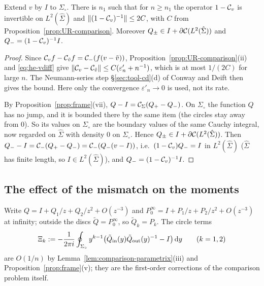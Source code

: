 \begin{proposition}\label{prop:UR-true}
Extend $v$ by $I$ to $\Sigma_{\circ}$. There is $n_1$ such that for $n\ge n_1$ the operator $1-\mathcal{C}_v$ is invertible on
$L^2(\hat\Sigma)$ and $\|(1-\mathcal{C}_v)^{-1}\|\le2C$, with $C$ from Proposition~\ref{prop:UR-comparison}. Moreover
$Q_\pm\in I+\partial\mathcal{C}(L^2(\hat\Sigma))$ and $Q_-=(1-\mathcal{C}_v)^{-1}I$.
\end{proposition}

\begin{proof}
Since $\mathcal{C}_vf-\mathcal{C}_{\tilde v}f=\mathcal{C}_-(f(v-\tilde v))$, Proposition~\ref{prop:UR-comparison}(ii) and
\eqref{eq:he-vdiff} give $\|\mathcal{C}_v-\mathcal{C}_{\tilde v}\|\le C(\varepsilon'_n+n^{-1})$, which is at most $1/(2C)$ for
large $n$. The Neumann-series step \S\ref{sec:tool-cd}(d) of Conway and Deift then gives the bound. Here only the convergence
$\varepsilon'_n\to0$ is used, not its rate.

By Proposition~\ref{prop:frame}(vii), $Q-I=\mathcal{C}_\Sigma(Q_+-Q_-)$. On $\Sigma_{\circ}$ the function $Q$ has no jump, and it is bounded there by the same item
(the circles stay away from $0$). So its values on $\Sigma_{\circ}$ are the boundary values of the same Cauchy integral,
now regarded on $\hat\Sigma$ with density $0$ on $\Sigma_{\circ}$. Hence $Q_\pm\in I+\partial\mathcal{C}(L^2(\hat\Sigma))$. Then
$Q_--I=\mathcal{C}_-(Q_+-Q_-)=\mathcal{C}_-(Q_-(v-I))$, i.e.\ $(1-\mathcal{C}_v)Q_-=I$ in $L^2(\hat\Sigma)$ ($\hat\Sigma$ has finite length,
so $I\in L^2(\hat\Sigma)$), and $Q_-=(1-\mathcal{C}_v)^{-1}I$.
\end{proof}

\subsection{The effect of the mismatch on the moments}\label{sec:he-moments}

Write $Q=I+Q_1/z+Q_2/z^2+O(z^{-3})$ and $P^\infty_0=I+P_1/z+P_2/z^2+O(z^{-3})$ at infinity; outside the discs $\tilde Q=P^\infty_0$,
so $\tilde Q_k=P_k$. The circle terms
\begin{equation}\label{eq:he-Xi}
  \Xi_k:=-\frac1{2\pi i}\oint_{\Sigma_{\circ}}y^{k-1}\bigl(\tilde Q_{\mathrm{in}}(y)\tilde Q_{\mathrm{out}}(y)^{-1}-I\bigr)\,\mathrm{d} y
  \qquad(k=1,2)
\end{equation}
are $O(1/n)$ by Lemma~\ref{lem:comparison-parametrix}(iii) and Proposition~\ref{prop:frame}(v); they are the first-order corrections of the
comparison problem itself.

